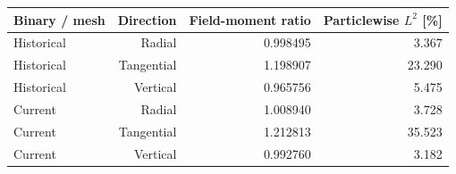 \begin{tabular}{lrrr}
\toprule
Binary / mesh & Direction & Field-moment ratio & Particlewise $L^2$ [\%] \\
\midrule
Historical & Radial & 0.998495 & 3.367 \\
Historical & Tangential & 1.198907 & 23.290 \\
Historical & Vertical & 0.965756 & 5.475 \\
Current & Radial & 1.008940 & 3.728 \\
Current & Tangential & 1.212813 & 35.523 \\
Current & Vertical & 0.992760 & 3.182 \\
\bottomrule
\end{tabular}
